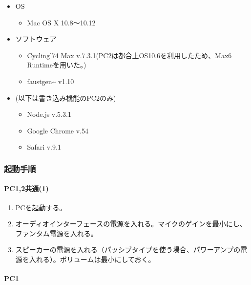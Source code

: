 \documentclass[a4paper]{jsarticle}
\begin{document}
\begin{itemize}
\tightlist
\item
  OS

  \begin{itemize}
  \tightlist
  \item
    Mac OS X 10.8〜10.12
  \end{itemize}
\item
  ソフトウェア

  \begin{itemize}
  \tightlist
  \item
    Cycling'74 Max v.7.3.1(PC2は都合上OS10.6を利用したため、Max6
    Runtimeを用いた。)
  \item
    faustgen\textasciitilde{} v1.10
  \end{itemize}
\item
  (以下は書き込み機能のPC2のみ)

  \begin{itemize}
  \tightlist
  \item
    Node.js v.5.3.1
  \item
    Google Chrome v.54
  \item
    Safari v.9.1
  \end{itemize}
\end{itemize}

\subsubsection{起動手順}\label{ux8d77ux52d5ux624bux9806}

\paragraph{PC1,2共通(1)}\label{pc12ux5171ux901a1}

\begin{enumerate}
\def\labelenumi{\arabic{enumi}.}
\tightlist
\item
  PCを起動する。
\item
  オーディオインターフェースの電源を入れる。マイクのゲインを最小にし、ファンタム電源を入れる。
\item
  スピーカーの電源を入れる（パッシブタイプを使う場合、パワーアンプの電源を入れる）。ボリュームは最小にしておく。
\end{enumerate}

\paragraph{PC1}\label{pc1}
\end{document}
